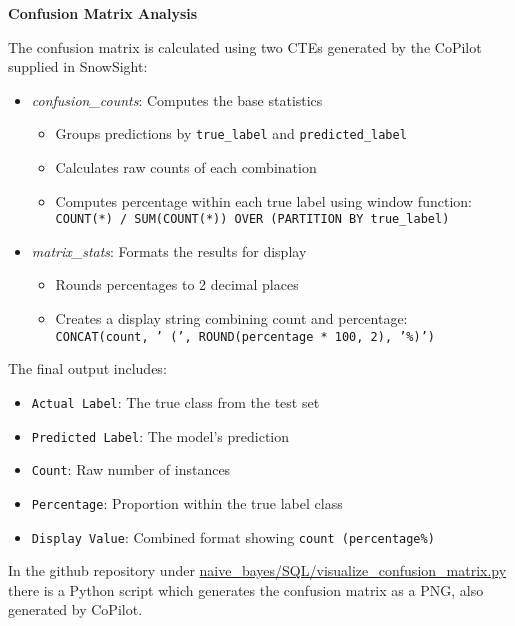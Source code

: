 \documentclass{article}
\begin{document}
\medskip \noindent \textbf{Confusion Matrix Analysis}

The confusion matrix is calculated using two CTEs generated by the CoPilot supplied in SnowSight:

\begin{itemize}
    \item \textit{confusion\_counts}: Computes the base statistics
    \begin{itemize}
        \item Groups predictions by \texttt{true\_label} and \texttt{predicted\_label}
        \item Calculates raw counts of each combination
        \item Computes percentage within each true label using window function:\\
        \texttt{COUNT(*) / SUM(COUNT(*)) OVER (PARTITION BY true\_label)}
    \end{itemize}
    
    \item \textit{matrix\_stats}: Formats the results for display
    \begin{itemize}
        \item Rounds percentages to 2 decimal places
        \item Creates a display string combining count and percentage:\\
        \texttt{CONCAT(count, ' (', ROUND(percentage * 100, 2), '\%)')}
    \end{itemize}
\end{itemize}

\medskip \noindent The final output includes:
\begin{itemize}
    \item \texttt{Actual Label}: The true class from the test set
    \item \texttt{Predicted Label}: The model's prediction
    \item \texttt{Count}: Raw number of instances
    \item \texttt{Percentage}: Proportion within the true label class
    \item \texttt{Display Value}: Combined format showing \texttt{count (percentage\%)}
\end{itemize}

\medskip \noindent In the github repository under \url{naive_bayes/SQL/visualize_confusion_matrix.py} there is a Python script which generates the confusion matrix as a PNG, also generated by CoPilot.
 
\end{document}
